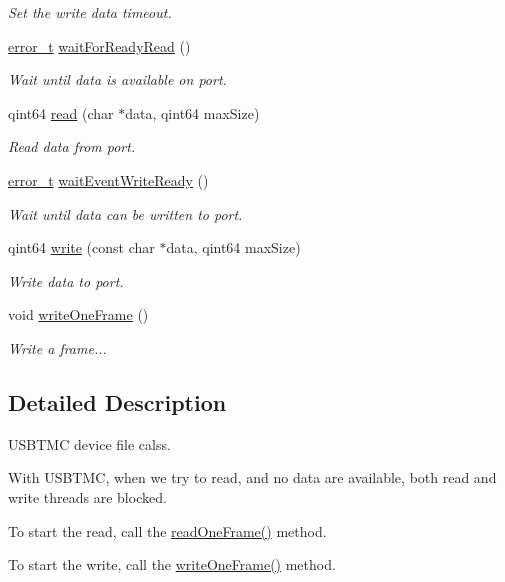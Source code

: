 \begin{DoxyCompactItemize}
\begin{DoxyCompactList}\small\item\em Set the write data timeout. \end{DoxyCompactList}\item 
\hyperlink{classmdt_abstract_port_ad4121bb930c95887e77f8bafa065a85e}{error\_\-t} \hyperlink{classmdt_usbtmc_port_a3c1b746acfc06857eee4b4c136cd65ad}{waitForReadyRead} ()
\begin{DoxyCompactList}\small\item\em Wait until data is available on port. \end{DoxyCompactList}\item 
qint64 \hyperlink{classmdt_usbtmc_port_a91f45336ca9a71284e0309182f5e8ca1}{read} (char $\ast$data, qint64 maxSize)
\begin{DoxyCompactList}\small\item\em Read data from port. \end{DoxyCompactList}\item 
\hyperlink{classmdt_abstract_port_ad4121bb930c95887e77f8bafa065a85e}{error\_\-t} \hyperlink{classmdt_usbtmc_port_a24cfc5233e09b9dbcdb2adc5f700dc4a}{waitEventWriteReady} ()
\begin{DoxyCompactList}\small\item\em Wait until data can be written to port. \end{DoxyCompactList}\item 
qint64 \hyperlink{classmdt_usbtmc_port_a32b98d2a61617293c328a343d62d52c3}{write} (const char $\ast$data, qint64 maxSize)
\begin{DoxyCompactList}\small\item\em Write data to port. \end{DoxyCompactList}\item 
void \hyperlink{classmdt_usbtmc_port_a97fca5f136f232275d90ab5b8c5ce285}{writeOneFrame} ()
\begin{DoxyCompactList}\small\item\em Write a frame... \end{DoxyCompactList}\end{DoxyCompactItemize}


\subsection{Detailed Description}
USBTMC device file calss. 

With USBTMC, when we try to read, and no data are available, both read and write threads are blocked.\par
 To start the read, call the \hyperlink{classmdt_usbtmc_port_a86ee5e17c32dea75e9f918389d3f7afc}{readOneFrame()} method.\par
 To start the write, call the \hyperlink{classmdt_usbtmc_port_a97fca5f136f232275d90ab5b8c5ce285}{writeOneFrame()} method. 

